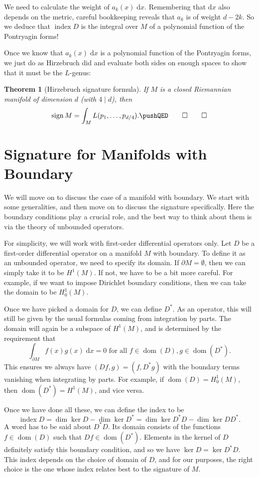 \documentclass{shortart}
\newtheorem{thm}{Theorem}[section]
\theoremstyle{definition}
\renewcommand\d{\mathrm{d}}
\DeclareMathOperator\dom{dom}
\DeclareMathOperator\idx{index}
\DeclareMathOperator\sign{sign}
\begin{document}
We need to calculate the weight of $a_k(x) \;\d x$. Remembering that $\d x$ also depends on the metric, careful bookkeeping reveals that $a_k$ is of weight $d - 2k$. So we deduce that $\idx D$ is the integral over $M$ of a polynomial function of the Pontryagin forms!

Once we know that $a_k (x) \;\d x$ is a polynomial function of the Pontryagin forms, we just do as Hirzebruch did and evaluate both sides on enough spaces to show that it must be the $L$-genus:
\begin{thm}[Hirzebruch signature formula]
  If $M$ is a closed Riemannian manifold of dimension $d$ (with $4 \mid d$), then
  \[
    \sign M = \int_M L(p_1, \ldots, p_{d/4}).\fakeqed
  \]\ifplastex\fakeqed\fi
\end{thm}

\section{Signature for Manifolds with Boundary}\label{section:signature-with-boundary}
We will move on to discuss the case of a manifold with boundary. We start with some generalities, and then move on to discuss the signature specifically. Here the boundary conditions play a crucial role, and the best way to think about them is via the theory of unbounded operators.

For simplicity, we will work with first-order differential operators only. Let $D$ be a first-order differential operator on a manifold $M$ with boundary. To define it as an unbounded operator, we need to specify its domain. If $\partial M = \emptyset$, then we can simply take it to be $H^1(M)$. If not, we have to be a bit more careful. For example, if we want to impose Dirichlet boundary conditions, then we can take  the domain to be $H^1_0(M)$.

Once we have picked a domain for $D$, we can define $D^*$. As an operator, this will still be given by the usual formulas coming from integration by parts. The domain will again be a subspace of $H^1(M)$, and is determined by the requirement that
\[
  \int_{\partial M} f(x)g(x) \;\d x = 0\text{ for all }f \in \dom(D), g \in \dom(D^*).
\]
This ensures we always have $(Df, g) = (f, D^*g)$ with the boundary terms vanishing when integrating by parts. For example, if $\dom(D) = H^1_0(M)$, then $\dom (D^*) = H^1(M)$, and vice versa.

Once we have done all these, we can define the index to be
\[
  \idx D = \dim \ker D - \dim \ker D^* = \dim \ker D^*D - \dim \ker D D^*.
\]
A word has to be said about $D^*D$. Its domain consists of the functions $f \in \dom(D)$ such that $Df \in \dom (D^*)$. Elements in the kernel of $D$ definitely satisfy this boundary condition, and so we have $\ker D = \ker D^*D$. This index depends on the choice of domain of $D$, and for our purposes, the right choice is the one whose index relates best to the signature of $M$.
\end{document}
